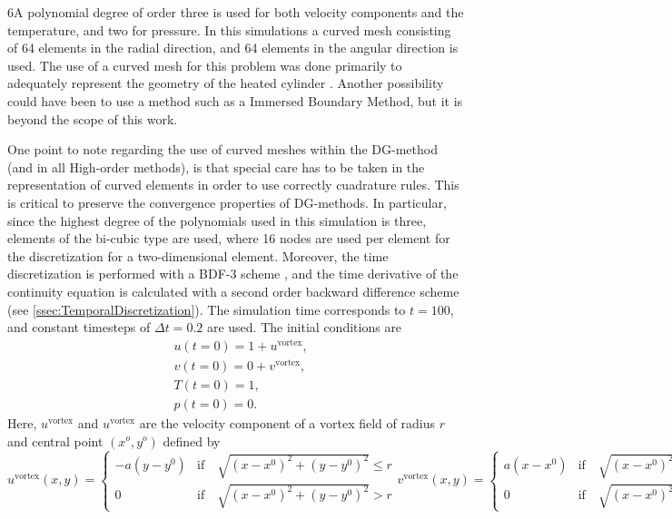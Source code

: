 6A polynomial degree of order three is used for both velocity components and the temperature, and two for pressure. In this simulations a curved mesh consisting of 64 elements in the radial direction, and 64 elements in the angular direction is used. The use of a curved mesh for this problem was done primarily to adequately represent the geometry of the heated cylinder . Another possibility could have been to use a method such as a Immersed Boundary Method, but it is beyond the scope of this work.

 One point to note regarding the use of curved meshes within the DG-method (and in all High-order methods), is that special care has to be taken in the representation of curved elements \citep{bassiHighOrderAccurateDiscontinuous1997} in order to use correctly cuadrature rules. This is critical to preserve the convergence properties of DG-methods. In particular, since the highest degree of the polynomials used in this simulation is three, elements of the bi-cubic type are used, where 16 nodes are used per element for the discretization for a two-dimensional element. Moreover, the time discretization is performed with a BDF-3 scheme , and the time derivative of the continuity equation is calculated with a second order backward difference scheme (see \cref{ssec:TemporalDiscretization}). The simulation time corresponds to $t= 100$, and constant timesteps of $\Delta t = 0.2$ are used. The initial conditions are
\begin{subequations} 
\begin{align}
&u(t=0) = 1 + u^{\text{vortex}},  \\
&v(t=0) = 0 + v^{\text{vortex}},  \\
&T(t=0) = 1,\\
&p(t=0) = 0.
\end{align}
\end{subequations}
Here, $u^{\text{vortex}}$ and $u^{\text{vortex}}$ are the velocity component of a vortex field of radius $r$ and central point $(x^o,y^o)$ defined by 
{
\begin{subequations}
\begin{equation}
	u^{\text{vortex}}(x,y) = 
	\begin{cases}
		-a(y-y^0) & \text{if} \quad\sqrt{(x-x^0)^2+(y-y^0)^2} \leq r \\
		0 & \text{if} \quad\sqrt{(x-x^0)^2+(y-y^0)^2} > r
	\end{cases}
\end{equation}\label{eq:VortexU}
\begin{equation}
	v^{\text{vortex}}(x,y) = 
	\begin{cases}
		a(x-x^0) & \text{if} \quad\sqrt{(x-x^0)^2+(y-y^0)^2} \leq r \\
		0 & \text{if} \quad\sqrt{(x-x^0)^2+(y-y^0)^2} > r
	\end{cases}
\end{equation}	\label{eq:VortexV}
\end{subequations}
}%
